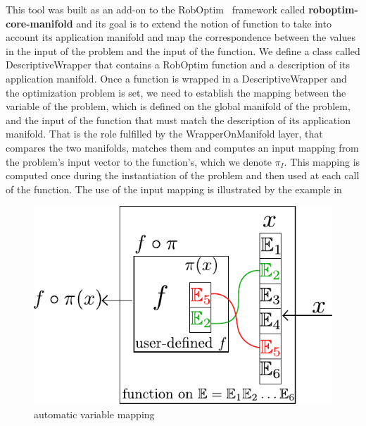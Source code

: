 This tool was built as an add-on to the RobOptim~\cite{moulard:jsme:2013} framework called {\bf roboptim-core-manifold} and its goal is to extend the notion of function to take into account its application manifold and map the correspondence between the values in the input of the problem and the input of the function.
We define a class called DescriptiveWrapper that contains a RobOptim function and a description of its application manifold.
Once a function is wrapped in a DescriptiveWrapper and the optimization problem is set, we need to establish the mapping between the variable of the problem, which is defined on the global manifold of the problem, and the input of the function that must match the description of its application manifold.
That is the role fulfilled by the WrapperOnManifold layer, that compares the two manifolds, matches them and computes an input mapping from the problem's input vector to the function's, which we denote $\pi_I$.
This mapping is computed once during the instantiation of the problem and then used at each call of the function.
The use of the input mapping is illustrated by the example in~

\begin{figure}[!htb]
\centering
  \centering
  \setlength\fboxsep{0pt}
  \includegraphics[width=.5\linewidth]{auto_mapping_text.pdf}
\caption{automatic variable mapping}
\label{fig:auto_map}
\end{figure}


